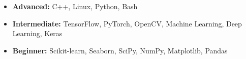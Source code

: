 \begin{itemize}[leftmargin=*,itemsep=0.0em]
    \item \textbf{Advanced:} C++, Linux, Python, Bash
    \item \textbf{Intermediate:} TensorFlow, PyTorch, OpenCV, Machine Learning, Deep Learning, Keras
    \item \textbf{Beginner:} Scikit-learn, Seaborn, SciPy, NumPy, Matplotlib, Pandas
\end{itemize}
